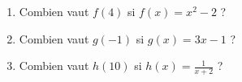
\begin{exercice}\label{exosmath-0640}

    \begin{enumerate}
        \item
            Combien vaut \( f(4)\) si \( f(x)=x^2-2\) ?
        \item
            Combien vaut \( g(-1)\) si \( g(x)=3x-1\) ?
        \item
            Combien vaut \( h(10)\) si \( h(x)=\frac{1}{ x+2 }\) ?
    \end{enumerate}

\end{exercice}
